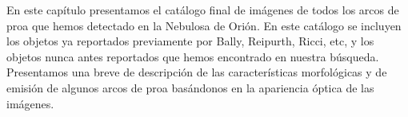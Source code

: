 %



%


\label{chap:results}

En este capítulo presentamos el catálogo final de imágenes  de todos los arcos de proa que hemos detectado en la Nebulosa de Orión. En este catálogo se incluyen los objetos ya reportados previamente por Bally, Reipurth, Ricci, etc, y los objetos nunca antes reportados que hemos encontrado en nuestra búsqueda. Presentamos una breve de descripción de las características morfológicas y de emisión de algunos arcos de proa basándonos en la apariencia óptica de las imágenes.\\

